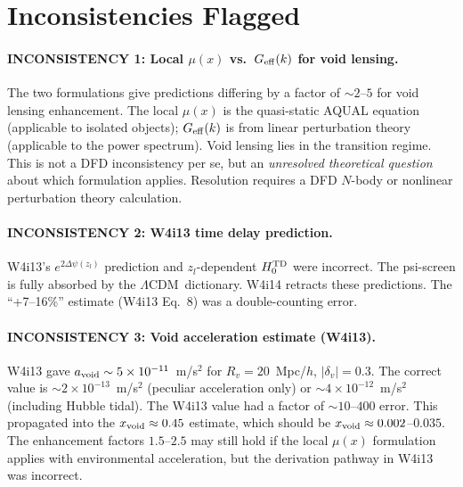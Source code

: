 \documentclass[11pt,a4paper]{article}
\newcommand{\LCDM}{$\Lambda$CDM}
\newcommand{\Geff}{G_{\rm eff}}
\newcommand{\Dpsi}{\Delta\psi}
\newcommand{\ee}[1]{\times 10^{#1}}
\begin{document}
\section{Inconsistencies Flagged}

\paragraph{INCONSISTENCY 1: Local $\mu(x)$ vs.\ $\Geff(k)$ for void lensing.}
The two formulations give predictions differing by a factor of $\sim 2$--$5$
for void lensing enhancement.  The local $\mu(x)$ is the quasi-static
AQUAL equation (applicable to isolated objects); $\Geff(k)$ is from
linear perturbation theory (applicable to the power spectrum).  Void
lensing lies in the transition regime.  This is not a DFD inconsistency
per se, but an \emph{unresolved theoretical question} about which
formulation applies.  Resolution requires a DFD $N$-body or nonlinear
perturbation theory calculation.

\paragraph{INCONSISTENCY 2: W4i13 time delay prediction.}
W4i13's $e^{2\Dpsi(z_l)}$ prediction and $z_l$-dependent $H_0^{\rm TD}$
were incorrect.  The psi-screen is fully absorbed by the \LCDM\
dictionary.  W4i14 retracts these predictions.  The ``+7--16\%''
estimate (W4i13 Eq.~8) was a double-counting error.

\paragraph{INCONSISTENCY 3: Void acceleration estimate (W4i13).}
W4i13 gave $a_{\rm void} \sim 5\ee{-11}$~m/s$^2$ for $R_v = 20$~Mpc/$h$,
$|\delta_v| = 0.3$.  The correct value is $\sim 2\ee{-13}$~m/s$^2$
(peculiar acceleration only) or $\sim 4\ee{-12}$~m/s$^2$ (including
Hubble tidal).  The W4i13 value had a factor of $\sim 10$--$400$ error.
This propagated into the $x_{\rm void} \approx 0.45$ estimate, which
should be $x_{\rm void} \approx 0.002$--$0.035$.  The enhancement
factors $1.5$--$2.5$ may still hold if the local $\mu(x)$ formulation
applies with environmental acceleration, but the derivation pathway
in W4i13 was incorrect.


\end{document}
